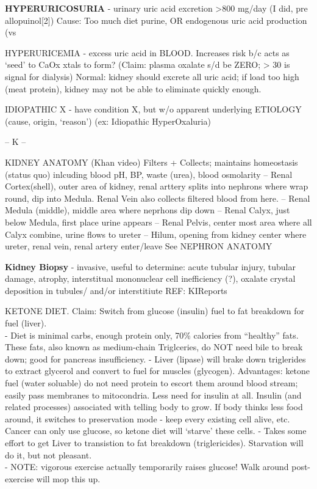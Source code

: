 \textbf{HYPERURICOSURIA} - urinary uric acid excretion \textgreater800
mg/day (I did, pre allopuinol{[}2{]}) Cause: Too much diet purine, OR
endogenous uric acid production (vs

HYPERURICEMIA - excess uric acid in BLOOD. Increases risk b/c acts as
`seed' to CaOx xtals to form? (Claim: plasma oxalate s/d be ZERO;
\textgreater{} 30 is signal for dialysis) Normal: kidney should excrete
all uric acid; if load too high (meat protein), kidney may not be able
to eliminate quickly enough.

IDIOPATHIC X - have condition X, but w/o apparent underlying ETIOLOGY
(cause, origin, `reason') (ex: Idiopathic HyperOxaluria)

-- K --

KIDNEY ANATOMY (Khan video) Filters + Collects; maintains homeostasis
(status quo) inlcuding blood pH, BP, waste (urea), blood osmolarity --
Renal Cortex(shell), outer area of kidney, renal arttery splits into
nephrons where wrap round, dip into Medula. Renal Vein also collects
filtered blood from here. -- Renal Medula (middle), middle area where
neprhons dip down -- Renal Calyx, just below Medula, first place urine
appears -- Renal Pelvis, center most area where all Calyx combine, urine
flows to ureter -- Hilum, opening from kidney center where ureter, renal
vein, renal artery enter/leave See NEPHRON ANATOMY

\textbf{Kidney Biopsy} - invasive, useful to determine: acute tubular
injury, tubular damage, atrophy, interstitual mononuclear cell
inefficiency (?), oxalate crystal deposition in tubules/ and/or
interstitiute REF: KIReports

KETONE DIET. Claim: Switch from glucose (insulin) fuel to fat breakdown
for fuel (liver).\\
- Diet is minimal carbs, enough protein only, 70\% calories from
``healthy'' fats. These fats, also known as medium-chain Triglceries, do
NOT need bile to break down; good for pancreas insufficiency. - Liver
(lipase) will brake down triglerides to extract glycerol and convert to
fuel for muscles (glycogen). Advantages: ketone fuel (water soluable) do
not need protein to escort them around blood stream; easily pass
membranes to mitocondria. Less need for insulin at all. Insulin (and
related processes) associated with telling body to grow. If body thinks
less food around, it switches to preservation mode - keep every existing
cell alive, etc. Cancer can only use glucose, so ketone diet will
`starve' these cells. - Takes some effort to get Liver to transistion to
fat breakdown (triglericides). Starvation will do it, but not
pleasant.\\
- NOTE: vigorous exercise actually temporarily raises glucose! Walk
around post-exercise will mop this up.

